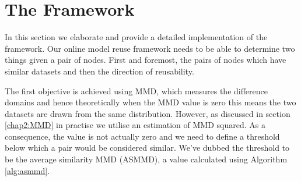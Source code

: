 \documentclass{mpaper}
\begin{document}



\section{The Framework}\label{chap:framework}


In this section we elaborate and provide a detailed implementation of the framework. Our online model reuse framework needs to be able to determine two things given a pair of nodes. First and foremost, the pairs of nodes which have similar datasets and then the direction of reusability. 

The first objective is achieved using MMD, which measures the difference domains and hence theoretically when the MMD value is zero this means the two datasets are drawn from the same distribution. However, as discussed in section \ref{chap2:MMD} in practise we utilise an estimation of MMD squared. As a consequence, the value is not actually zero and we need to define a threshold below which a pair would be considered similar. We've dubbed the threshold to be the average similarity MMD (ASMMD), a value calculated using Algorithm \ref{alg:asmmd}. 

\SetInd{0.1em}{0.5em}
\SetNlSkip{0.3em}
\end{document}
